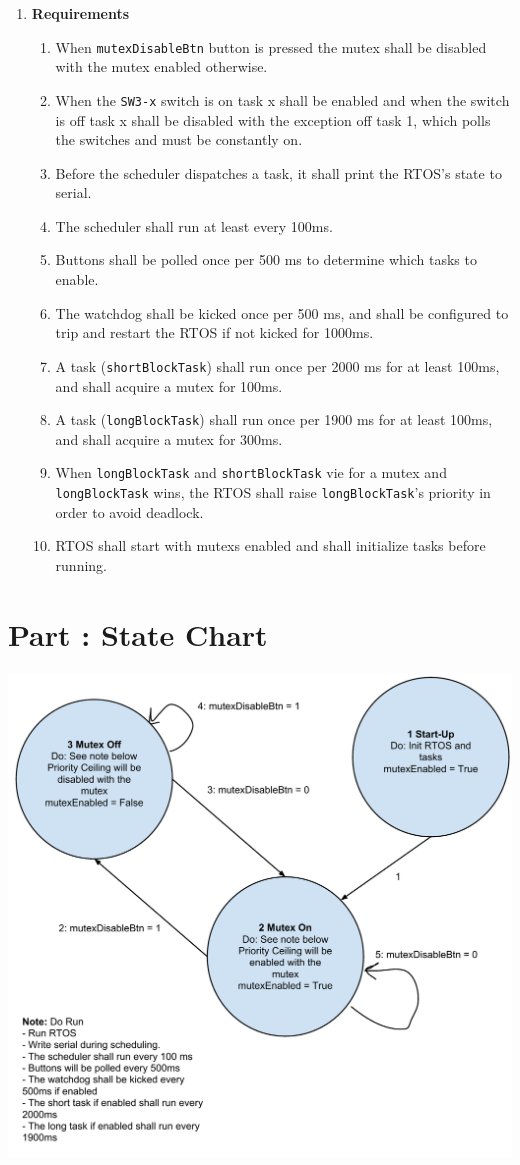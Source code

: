 \documentclass{article}
\newcounter{partNum}
\newcommand{\partNum}{%
        \stepcounter{partNum}%
        \thepartNum}
\newcommand{\sectPart}[1]{\section*{Part \partNum: #1}}
\newcommand{\bitem}[1]{\item \textbf{#1}}
\begin{document}
\begin{enumerate}
\bitem{Requirements}
	\begin{enumerate}
	\item When \texttt{mutexDisableBtn} button is pressed the mutex shall be disabled with the mutex enabled otherwise.
	\item When the \texttt{SW3-x} switch is on task x shall be enabled and when the switch is off task x shall be disabled with the exception off task 1, which polls the switches and must be constantly on.
	\item Before the scheduler dispatches a task, it shall print the RTOS's state to serial.
	\item The scheduler shall run at least every 100ms.
	\item Buttons shall be polled once per 500 ms to determine which tasks to enable.
	\item The watchdog shall be kicked once per 500 ms, and shall be configured to trip and restart the RTOS if not kicked for 1000ms.
	\item A task (\texttt{shortBlockTask}) shall run once per 2000 ms for at least 100ms, and shall acquire a mutex for 100ms.
	\item A task (\texttt{longBlockTask}) shall run once per 1900 ms for at least 100ms, and shall acquire a mutex for 300ms.
	\item When \texttt{longBlockTask} and \texttt{shortBlockTask} vie for a mutex and \texttt{longBlockTask} wins, the RTOS shall raise \texttt{longBlockTask}'s priority in order to avoid deadlock.
	\item RTOS shall start with mutexs enabled and shall initialize tasks before running.
	\end{enumerate}
\end{enumerate}


\sectPart{State Chart}

\begin{center}
    \includegraphics[scale=.5]{RTOS_State_Chart.pdf}
\end{center}
\end{document}
